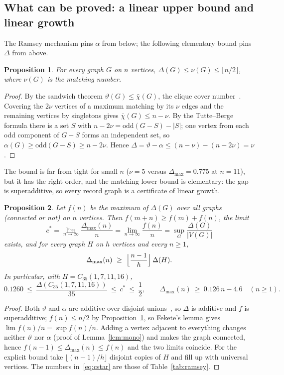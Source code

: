 \documentclass[11pt]{article}
\newtheorem{proposition}{Proposition}
\renewcommand{\theta}{\vartheta}
\newcommand{\gap}{\Delta}
\begin{document}
\subsection{What can be proved: a linear upper bound and linear growth}\label{sec:theory}

The Ramsey mechanism pins $\alpha$ from below; the following elementary bound pins $\gap$ from above.

\begin{proposition}\label{prop:nu}
For every graph $G$ on $n$ vertices, $\gap(G)\le\nu(G)\le\lfloor n/2\rfloor$, where $\nu(G)$ is the matching number.
\end{proposition}
\begin{proof}
By the sandwich theorem $\theta(G)\le\bar\chi(G)$, the clique cover number~\cite{knuth1994}. Covering the $2\nu$ vertices of a maximum matching by its $\nu$ edges and the remaining vertices by singletons gives $\bar\chi(G)\le n-\nu$. By the Tutte--Berge formula there is a set $S$ with $n-2\nu=\mathrm{odd}(G-S)-|S|$; one vertex from each odd component of $G-S$ forms an independent set, so $\alpha(G)\ge\mathrm{odd}(G-S)\ge n-2\nu$. Hence $\gap=\theta-\alpha\le(n-\nu)-(n-2\nu)=\nu$.
\end{proof}

The bound is far from tight for small $n$ ($\nu=5$ versus $\gap_{\max}=0.775$ at $n=11$), but it has the right order, and the matching lower bound is elementary: the gap is superadditive, so every record graph is a certificate of linear growth.

\begin{proposition}\label{prop:fekete}
Let $f(n)$ be the maximum of $\gap(G)$ over all graphs (connected or not) on $n$ vertices. Then $f(m+n)\ge f(m)+f(n)$, the limit
\[
c^*=\lim_{n\to\infty}\frac{\gap_{\max}(n)}{n}=\lim_{n\to\infty}\frac{f(n)}{n}=\sup_{G}\frac{\gap(G)}{|V(G)|}
\]
exists, and for every graph $H$ on $h$ vertices and every $n\ge1$,
\[
\gap_{\max}(n)\ \ge\ \Bigl\lfloor\frac{n-1}{h}\Bigr\rfloor\,\gap(H).
\]
In particular, with $H=C_{35}(1,7,11,16)$,
\begin{equation}\label{eq:cstar}
0.1260\ \le\ \frac{\gap(C_{35}(1,7,11,16))}{35}\ \le\ c^*\ \le\ \frac12,\qquad \gap_{\max}(n)\ \ge\ 0.126\,n-4.6\quad(n\ge1).
\end{equation}
\end{proposition}
\begin{proof}
Both $\theta$ and $\alpha$ are additive over disjoint unions~\cite{knuth1994}, so $\gap$ is additive and $f$ is superadditive; $f(n)\le n/2$ by Proposition~\ref{prop:nu}, so Fekete's lemma gives $\lim f(n)/n=\sup f(n)/n$. Adding a vertex adjacent to everything changes neither $\theta$ nor $\alpha$ (proof of Lemma~\ref{lem:mono}) and makes the graph connected, hence $f(n-1)\le\gap_{\max}(n)\le f(n)$ and the two limits coincide. For the explicit bound take $\lfloor (n-1)/h\rfloor$ disjoint copies of $H$ and fill up with universal vertices. The numbers in~\eqref{eq:cstar} are those of Table~\ref{tab:ramsey}.
\end{proof}
\end{document}
